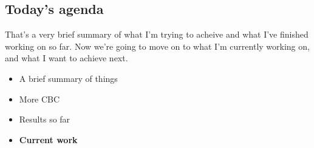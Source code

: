 \documentclass[11pt]{article}
\begin{document}
\subsection{Today's agenda}
\label{sec:orgfac0ff3}

That's a very brief summary of what I'm trying to acheive and what I've finished working on so far.
Now we're going to move on to what I'm currently working on, and what I want to achieve next.

\begin{itemize}
\item A brief summary of things

\item More CBC

\item Results so far

\item \textbf{Current work}
\end{itemize}
\end{document}

